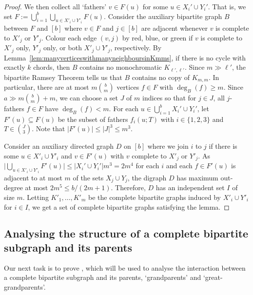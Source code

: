 \documentclass[11pt,english]{article}
\theoremstyle{plain}
\theoremstyle{definition}
\theoremstyle{remark}
\begin{document}
\begin{proof}
        We then collect all `fathers' $v\in F(u)$ for some $u\in X_i'\cup Y_i'$.
        That is, we set $F:=\bigcup_{i=1}^{b}\bigcup_{u\in X'_i\cup Y'_i}F(u)$.
        Consider the auxiliary bipartite graph $B$ between $F$ and $[b]$ where $v\in F$ and $j\in [b]$ are adjacent whenever $v$ is complete to  $X'_j$ or $Y'_j$. Colour each edge $(v,j)$ by red, blue, or green if $v$ is complete to $X'_j$ only, $Y'_j$ only, or both $X'_j\cup Y'_j$, respectively.
        By Lemma~\ref{lem:manyverticeswithmanyneighboursinKmms}, if there is no cycle with exactly $k$ chords, then $B$ contains no monochromatic  $K_{\ell', \ell'}$. Since $m\gg \ell'$, the bipartite Ramsey Theorem tells us that $B$ contains no copy of $K_{m,m}$. 
        In particular, there are at most $m\binom bm$ vertices $f\in F$ with $\deg_B(f)\geq m$. Since $a\gg m\binom bm+m$, we can choose a set $J$ of $m$  indices so that for $j\in J$, all $j$-fathers $f\in F$ have $\deg_B(f)< m$. 
         For each $u\in \bigcup_{i=1}^bX_i'\cup Y_i'$, let $F'(u)\subseteq F(u)$ be the subset of fathers $f_i(u;T)$ with $i \in \{1,2,3\}$ and $T\in\binom{J}{3}$.
         Note that $|F'(u)|\leq |J|^3\leq m^3$.
        
        Consider an auxiliary directed graph $D$ on $[b]$ where we join $i$ to $j$ if there is some $u\in X'_i\cup Y'_i$ and $v\in F'(u)$ with $v$ complete to $X'_j$ or $Y'_j$. 
        As $\big|\bigcup_{u\in X'_{i}\cup Y'_i}F'(u)\big|\leq |X_i'\cup Y_i'|m^3 = 2m^4$ for each $i$ and each $f\in F'(u)$ is adjacent to at most $m$ of the sets $X_j\cup Y_j$, the digraph $D$ has maximum out-degree at most $2m^5\leq b/(2m+1)$. 
        Therefore, $D$ has an independent set $I$ of size $m$. Letting $K'_1, \dots, K'_m$ be the complete bipartite graphs induced by $X'_i\cup Y'_i$ for $i\in I$, we get a set of complete bipartite graphs satisfying the lemma. 
        \end{proof}
        
    \subsection{Analysing the structure of a complete bipartite subgraph and its parents}
    Our next task is to prove , which will be used to analyse the interaction between a complete bipartite subgraph and its parents, `grandparents' and `great-grandparents'.
        
\end{document}
